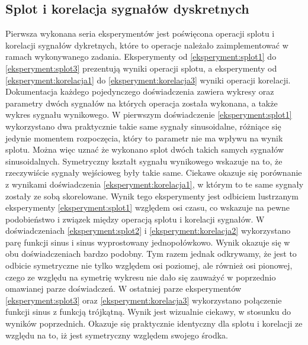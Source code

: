 \documentclass{article}
\begin{document}
    \subsection{Splot i korelacja sygnałów dyskretnych} {
        Pierwsza wykonana seria eksperymentów jest poświęcona operacji splotu i
        korelacji sygnałów dykretnych, które to operacje należało zaimplementować w
        ramach wykonywanego zadania. Eksperymenty od \ref{eksperyment:splot1} do
        \ref{eksperyment:splot3} prezentują wyniki operacji splotu, a eksperymenty od
        \ref{eksperyment:korelacja1} do \ref{eksperyment:korelacja3} wyniki operacji
        korelacji. Dokumentacja każdego pojedynczego doświadczenia zawiera wykresy
        oraz parametry dwóch sygnałów na których operacja została wykonana, a także
        wykres sygnału wynikowego. W pierwszym doświadczenie \ref{eksperyment:splot1}
        wykorzystano dwa praktycznie takie same sygnały sinusoidalne, różniące się
        jedynie momentem rozpoczęcia, który to parametr nie ma wpływu na wynik
        splotu. Można więc uznać że wykonano splot dwóch takich samych sygnałów
        sinusoidalnych. Symetryczny kształt sygnału wynikowego wskazuje na to, że
        rzeczywiście sygnały wejścioweg były takie same. Ciekawe okazuje się
        porównanie z wynikami doświadczenia \ref{eksperyment:korelacja1}, w którym to
        te same sygnały zostały ze sobą skorelowane. Wynik tego eksperymenty jest
        odbiciem lustrzanym eksperymenty \ref{eksperyment:splot1} względem osi czasu,
        co wskazuje na pewne podobieństwo i związek między operacją splotu i korelacji
        sygnałów. W doświadczeniach \ref{eksperyment:splot2} i
        \ref{eksperyment:korelacja2} wykorzystano parę funkcji sinus i sinus
        wyprostowany jednopołówkowo. Wynik okazuje się w obu doświadczeniach bardzo
        podobny. Tym razem jednak odkrywamy, że jest to odbicie symetryczne nie tylko
        względem osi poziomej, ale również osi pionowej, czego ze względu na symetrię
        wykresu nie dało się zauważyć w poprzednio omawianej parze doświadczeń. W
        ostatniej parze eksperymentów \ref{eksperyment:splot3} oraz
        \ref{eksperyment:korelacja3} wykorzystano połączenie funkcji sinus z funkcją
        trójkątną. Wynik jest wizualnie ciekawy, w stosunku do wyników poprzednich.
        Okazuje się praktycznie identyczny dla splotu i korelacji ze względu na to,
        iż jest symetryczny względem swojego środka.
    }
\end{document}

